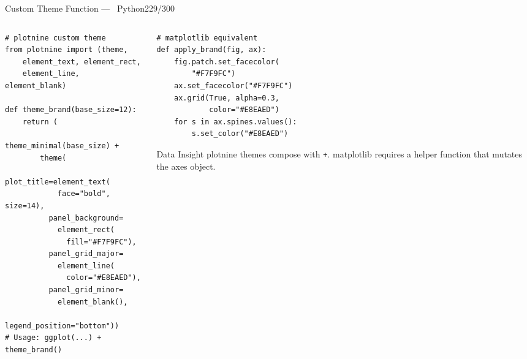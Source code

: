 \documentclass[10pt]{beamer}
\newcommand{\Python}{\textcolor{PyAccent}{\faPython~Python}}
\newcommand{\smark}[1]{\hfill{\scriptsize\color{codegray}#1}}
\begin{document}
\begin{frame}[fragile]{Custom Theme Function --- \Python}\smark{229/300}
\begin{columns}[T]
\begin{column}{0.55\textwidth}
\begin{lstlisting}[style=Pystyle]
# plotnine custom theme
from plotnine import (theme,
    element_text, element_rect,
    element_line, element_blank)

def theme_brand(base_size=12):
    return (
        theme_minimal(base_size) +
        theme(
          plot_title=element_text(
            face="bold", size=14),
          panel_background=
            element_rect(
              fill="#F7F9FC"),
          panel_grid_major=
            element_line(
              color="#E8EAED"),
          panel_grid_minor=
            element_blank(),
          legend_position="bottom"))
# Usage: ggplot(...) + theme_brand()
\end{lstlisting}
\end{column}
\begin{column}{0.42\textwidth}
\begin{lstlisting}[style=Pystyle]
# matplotlib equivalent
def apply_brand(fig, ax):
    fig.patch.set_facecolor(
        "#F7F9FC")
    ax.set_facecolor("#F7F9FC")
    ax.grid(True, alpha=0.3,
            color="#E8EAED")
    for s in ax.spines.values():
        s.set_color("#E8EAED")
\end{lstlisting}
\vspace{0.1cm}
\begin{exampleblock}{Data Insight}
    \scriptsize plotnine themes compose with \texttt{+}. matplotlib requires a helper function that mutates the axes object.
\end{exampleblock}
\end{column}
\end{columns}
\end{frame}
\end{document}

